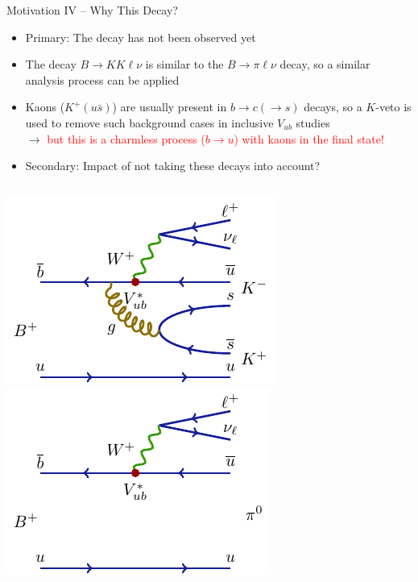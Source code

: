 \documentclass[serif]{beamer}
\begin{document}

\begin{frame}[t]{Motivation IV -- Why This Decay?}
\small
\vspace{-3mm}
\begin{block}{}
	\begin{itemize}
		\item Primary: The decay has not been observed yet
		\item The decay $B \rightarrow KK\ell\nu$ is similar to the $B \rightarrow \pi\ell\nu$ decay, so a similar analysis process can be applied
		\item Kaons ($K^+(u \bar s)$) are usually present in $b \to c (\to s)$ decays, so a $K$-veto is used to remove such background cases in inclusive $V_{ub}$ studies\\$\to$ \textcolor{red}{but this is a charmless process ($b \to u$) with kaons in the final state!}
		\item Secondary: Impact of not taking these decays into account?
	\end{itemize}
\end{block}

\begin{columns}
	\includegraphics[scale=0.9]{texfig/B2KKlnu}
	\includegraphics[scale=0.9]{texfig/B2pilnu}
\end{columns}


\end{frame}
\end{document}
